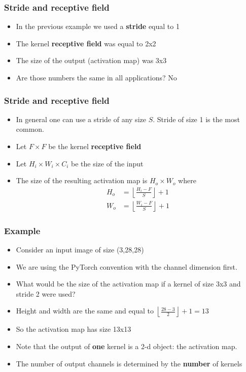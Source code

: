 \documentclass{beamer}
\begin{document}
\begin{frame}
    \frametitle{Stride and receptive field}
\begin{itemize}
    \item In the previous example we used a \textbf{stride} equal to 1
    \item The kernel \textbf{receptive field} was equal to 2x2
    \item The size of the output (activation map) was 3x3
    \item Are those numbers the same in all applications? No
\end{itemize}
    

\end{frame}  
\begin{frame}
    \frametitle{Stride and receptive field}
\begin{itemize}
    \item In general one can use a stride of any size $S$. Stride of size 1 is the most common.
    \item Let $F\times F$ be the kernel \textbf{receptive field} 
    \item Let $H_i\times W_i\times C_i$ be the size of the input
    \item The size of the resulting activation map is $H_o\times W_o$ where 
    \begin{align*}
        H_o&=\left\lfloor\frac{H_i-F}{S}\right\rfloor+1\\
        W_o&=\left\lfloor\frac{W_i-F}{S}\right\rfloor+1
    \end{align*}
\end{itemize}
\end{frame}  
\begin{frame}
    \frametitle{Example}
    \begin{itemize}
        \item Consider an input image of size (3,28,28)
        \item We are using the PyTorch convention with the channel dimension first.
        \item What would be the size of the activation map if a kernel of size 3x3 and stride 2 were used?

        \item Height and width are the same and equal to $\left\lfloor\frac{28-3}{2}\right\rfloor+1=13$
        \item So the activation map has size 13x13
        \item Note that the output of \textbf{one} kernel is a 2-d object: the activation map.
        \item The number of output channels is determined by the \textbf{number} of kernels
    \end{itemize}
\end{frame}
\end{document}
